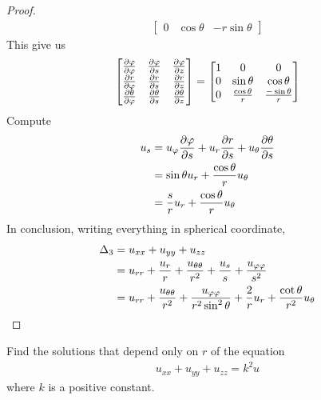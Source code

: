 \documentclass{report}
\begin{document}
\begin{proof}
\begin{align*}
\begin{bmatrix}
   0 & \cos \theta & -r \sin \theta
 \end{bmatrix}
\end{align*}
This give us 
\begin{align*}
\begin{bmatrix}
  \frac{\partial \pfi}{\partial \pfi} & \frac{\partial \pfi}{\partial s} & \frac{\partial \pfi}{\partial z} \\
  \frac{\partial r}{\partial \pfi} & \frac{\partial r}{\partial s} & \frac{\partial r}{\partial z} \\
  \frac{\partial \theta}{\partial \pfi} & \frac{\partial \theta}{\partial s} & \frac{\partial \theta}{\partial z} 
\end{bmatrix} = \begin{bmatrix}
1 & 0 & 0 \\
0 & \sin \theta & \cos \theta \\
0 & \frac{\cos \theta}{r} & \frac{-\sin \theta}{r}
\end{bmatrix}
\end{align*}
Compute 
\begin{align*}
u_s &= u_\pfi \frac{\partial \pfi}{\partial s} + u_r \frac{\partial r}{\partial s}+ u_\theta\frac{\partial  \theta}{\partial s} \\
&= \sin \theta u_r + \frac{\cos \theta}{r} u_\theta \\
&=\frac{s}{r}u_r + \frac{\cos \theta}{r}u_ \theta
\end{align*}
In conclusion, writing everything in spherical coordinate, 
\begin{align*}
\Delta_3 &= u_{xx}+u_{yy}+u_{zz}\\
&= u_{rr}+ \frac{u_r}{r}+ \frac{u_{\theta \theta}}{r^2} + \frac{u_s}{s}+ \frac{u_{\pfi \pfi}}{s^2}  \\
&= u_{rr}+ \frac{u_{\theta \theta}}{r^2} + \frac{u_{\pfi \pfi}}{r^2 \sin ^2 \theta} + \frac{2}{r} u_r + \frac{\cot \theta}{r^2}u_{\theta}
\end{align*}
\end{proof}
\begin{question}{}{}
Find the solutions that depend only on $r$ of the equation 
 \begin{align*}
u_{xx}+u_{yy}+u_{zz}= k^2 u
\end{align*}
where $k$ is a positive constant. 
\end{question}
\end{document}
